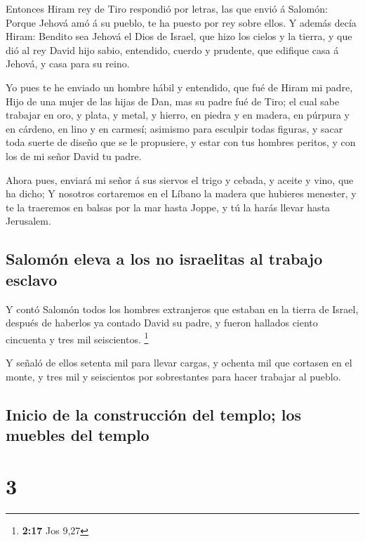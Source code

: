  Entonces Hiram rey de Tiro respondió por letras, las que
envió á Salomón: Porque Jehová amó á su pueblo, te ha puesto por rey
sobre ellos.  Y además decía Hiram: Bendito sea Jehová el
Dios de Israel, que hizo los cielos y la tierra, y que dió al rey David
hijo sabio, entendido, cuerdo y prudente, que edifique casa á Jehová, y
casa para su reino.

 Yo pues te he enviado un hombre hábil y entendido, que fué
de Hiram mi padre,  Hijo de una mujer de las hijas de Dan,
mas su padre fué de Tiro; el cual sabe trabajar en oro, y plata, y
metal, y hierro, en piedra y en madera, en púrpura y en cárdeno, en lino
y en carmesí; asimismo para esculpir todas figuras, y sacar toda suerte
de diseño que se le propusiere, y estar con tus hombres peritos, y con
los de mi señor David tu padre.

 Ahora pues, enviará mi señor á sus siervos el trigo y
cebada, y aceite y vino, que ha dicho;  Y nosotros
cortaremos en el Líbano la madera que hubieres menester, y te la
traeremos en balsas por la mar hasta Joppe, y tú la harás llevar hasta
Jerusalem.

\hypertarget{salomuxf3n-eleva-a-los-no-israelitas-al-trabajo-esclavo}{%
\subsection{Salomón eleva a los no israelitas al trabajo
esclavo}\label{salomuxf3n-eleva-a-los-no-israelitas-al-trabajo-esclavo}}

 Y contó Salomón todos los hombres extranjeros que estaban
en la tierra de Israel, después de haberlos ya contado David su padre, y
fueron hallados ciento cincuenta y tres mil seiscientos. \footnote{\textbf{2:17}
  Jos 9,27}

 Y señaló de ellos setenta mil para llevar cargas, y
ochenta mil que cortasen en el monte, y tres mil y seiscientos por
sobrestantes para hacer trabajar al pueblo.

\hypertarget{inicio-de-la-construcciuxf3n-del-templo-los-muebles-del-templo}{%
\subsection{Inicio de la construcción del templo; los muebles del
templo}\label{inicio-de-la-construcciuxf3n-del-templo-los-muebles-del-templo}}

\hypertarget{section-2}{%
\section{3}\label{section-2}}

